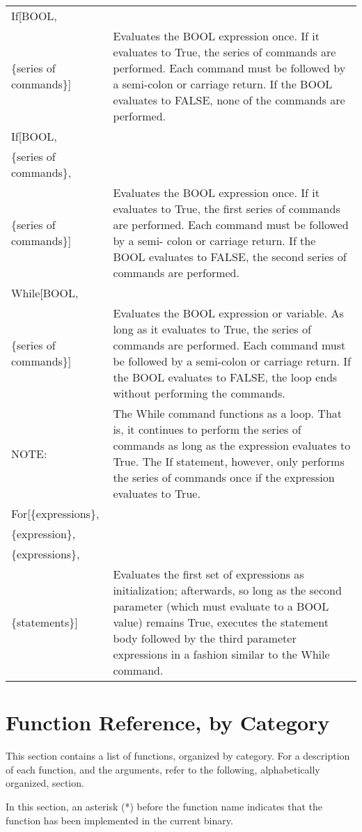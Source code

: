 \begin{tabular}{lp{4in}}
If[BOOL, & \\
\{series of commands\}] & Evaluates the BOOL expression
once. If it evaluates to True, the series of commands are performed.
Each command must be followed by a semi-colon or carriage return.  If
the BOOL evaluates to FALSE, none of the commands are performed.\\
If[BOOL, & \\
\{series of commands\}, & \\
\{series of commands\}] & Evaluates the BOOL expression
once. If it evaluates to True, the first series of commands are
performed.  Each command must be followed by a semi- colon or carriage
return.  If the BOOL evaluates to FALSE, the second series of
commands are performed. \\
While[BOOL, &\\
\{series of commands\}] & Evaluates the BOOL
expression or variable.  As long as it evaluates to True, the series
of commands are performed.  Each command must be followed by a
semi-colon or carriage return.  If the BOOL evaluates to FALSE, the
loop ends without performing the commands.\\
NOTE: & The While command functions as a
loop.  That is, it continues to perform the series of commands as long
as the expression evaluates to True.  The If statement, however, only
performs the series of commands once if the expression evaluates to
True.\\
For[\{expressions\}, & \\
\{expression\}, & \\
\{expressions\}, & \\
\{statements\}] & Evaluates the first set of expressions as initialization;
afterwards, so long as the second parameter (which must evaluate to a 
BOOL value) remains True, executes the statement body followed by the
third parameter expressions in a fashion similar to the While command.
\end{tabular}

\section{Function Reference, by Category}

This section contains a list of functions, organized by
category.  For a description of each function, and the arguments,
refer to the following, alphabetically organized, section.

\noindent In this section, an asterisk (*) before the function name indicates
that the function has been implemented in the current binary.

